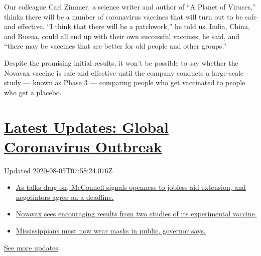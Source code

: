 Our colleague Carl Zimmer, a science writer and author of ``A Planet of
Viruses,'' thinks there will be a number of coronavirus vaccines that
will turn out to be safe and effective. ``I think that there will be a
patchwork,'' he told us. India, China, and Russia, could all end up with
their own successful vaccines, he said, and ``there may be vaccines that
are better for old people and other groups.''

Despite the promising initial results, it won't be possible to say
whether the Novavax vaccine is safe and effective until the company
conducts a large-scale study --- known as Phase 3 --- comparing people
who get vaccinated to people who get a placebo.

\hypertarget{latest-updates-global-coronavirus-outbreak}{%
\section{\texorpdfstring{\href{https://www.nytimes3xbfgragh.onion/2020/08/04/world/coronavirus-cases.html?action=click\&pgtype=Article\&state=default\&region=MAIN_CONTENT_1\&context=storylines_live_updates}{Latest
Updates: Global Coronavirus
Outbreak}}{Latest Updates: Global Coronavirus Outbreak}}\label{latest-updates-global-coronavirus-outbreak}}

Updated 2020-08-05T07:58:24.076Z

\begin{itemize}
\tightlist
\item
  \href{https://www.nytimes3xbfgragh.onion/2020/08/04/world/coronavirus-cases.html?action=click\&pgtype=Article\&state=default\&region=MAIN_CONTENT_1\&context=storylines_live_updates\#link-762df92}{As
  talks drag on, McConnell signals openness to jobless aid extension,
  and negotiators agree on a deadline.}
\item
  \href{https://www.nytimes3xbfgragh.onion/2020/08/04/world/coronavirus-cases.html?action=click\&pgtype=Article\&state=default\&region=MAIN_CONTENT_1\&context=storylines_live_updates\#link-1228a480}{Novavax
  sees encouraging results from two studies of its experimental
  vaccine.}
\item
  \href{https://www.nytimes3xbfgragh.onion/2020/08/04/world/coronavirus-cases.html?action=click\&pgtype=Article\&state=default\&region=MAIN_CONTENT_1\&context=storylines_live_updates\#link-794484ed}{Mississippians
  must now wear masks in public, governor says.}
\end{itemize}

\href{https://www.nytimes3xbfgragh.onion/2020/08/04/world/coronavirus-cases.html?action=click\&pgtype=Article\&state=default\&region=MAIN_CONTENT_1\&context=storylines_live_updates}{See
more updates}

